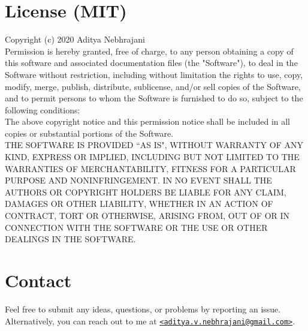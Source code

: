 \documentclass{article}
\begin{document}
\section{License (MIT)}
Copyright (c) 2020 Aditya Nebhrajani\\
Permission is hereby granted, free of charge, to any person obtaining a copy of this software and associated documentation files (the "Software"), to deal in the Software without restriction, including without limitation the rights to use, copy, modify, merge, publish, distribute, sublicense, and/or sell copies of the Software, and to permit persons to whom the Software is furnished to do so, subject to the following conditions:\\
The above copyright notice and this permission notice shall be included in all copies or substantial portions of the Software.\\
THE SOFTWARE IS PROVIDED ``AS IS", WITHOUT WARRANTY OF ANY KIND, EXPRESS OR IMPLIED, INCLUDING BUT NOT LIMITED TO THE WARRANTIES OF MERCHANTABILITY, FITNESS FOR A PARTICULAR PURPOSE AND NONINFRINGEMENT. IN NO EVENT SHALL THE AUTHORS OR COPYRIGHT HOLDERS BE LIABLE FOR ANY CLAIM, DAMAGES OR OTHER LIABILITY, WHETHER IN AN ACTION OF CONTRACT, TORT OR OTHERWISE, ARISING FROM, OUT OF OR IN CONNECTION WITH THE SOFTWARE OR THE USE OR OTHER DEALINGS IN THE SOFTWARE.

\section{Contact}
Feel free to submit any ideas, questions, or problems by reporting an issue. Alternatively, you can
reach out to me at \href{mailto:aditya.v.nebhrajani@gmail.com}{\texttt{\textless aditya.v.nebhrajani@gmail.com\textgreater}}.
\end{document}
